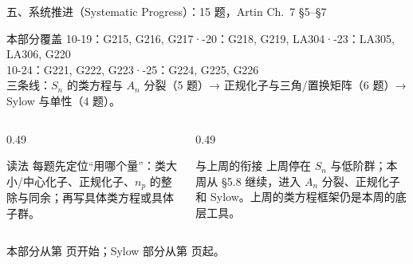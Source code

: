 \documentclass[aspectratio=169,10pt,fontset=none]{ctexbeamer}
\begin{document}
\begin{frame}[t]{五、系统推进（Systematic Progress）：15 题，Artin Ch.~7 \S5--\S7}
  \label{sec:sys}
  \begin{block}{\footnotesize 本部分覆盖}
    \scriptsize
    10-19：G215, G216, G217\quad·-20：G218, G219, LA304\quad·-23：LA305, LA306, G220\\
    10-24：G221, G222, G223\quad·-25：G224, G225, G226\\[2pt]
    三条线：$S_n$ 的类方程与 $A_n$ 分裂（5 题）→ 正规化子与三角/置换矩阵（6 题）→ Sylow 与单性（4 题）。
  \end{block}
  \begin{columns}[T,onlytextwidth]
    \begin{column}{0.49\textwidth}
      \begin{exampleblock}{\footnotesize 读法}
        \scriptsize
        每题先定位“用哪个量”：类大小/中心化子、正规化子、$n_p$ 的整除与同余；再写具体类方程或具体子群。
      \end{exampleblock}
    \end{column}
    \begin{column}{0.49\textwidth}
      \begin{block}{\footnotesize 与上周的衔接}
        \scriptsize
        上周停在 $S_n$ 与低阶群；本周从 \S5.8 继续，进入 $A_n$ 分裂、正规化子和 Sylow。上周的类方程框架仍是本周的底层工具。
      \end{block}
    \end{column}
  \end{columns}
  \vspace{0.2em}
  {\scriptsize\color{ink!70} 本部分从第 \pageref{ex:G215} 页开始；Sylow 部分从第 \pageref{ex:G223} 页起。}
\end{frame}

\end{document}
